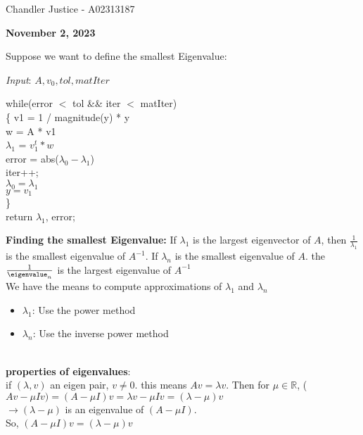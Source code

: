 \documentclass[12pt, AMS Euler]{article}
\newcommand{\R}{\mathbb{R}}
\begin{document}
\begin{flushright}
Chandler Justice - A02313187
\end{flushright}

\textbf{November 2, 2023}


Suppose we want to define the smallest Eigenvalue:

\textit{Input}: $A, v_0, tol, matIter$\\

\begin{listings}
	while(error $<$ tol \&\& iter $<$ matIter)\\
	\{
		v1 = 1 / magnitude(y) * y\\
		w = A * v1\\
		$\lambda_1$ = $v_1^t * w$\\

		error = abs($\lambda_0 - \lambda_1$)\\
		iter++;\\
		$\lambda_0 = \lambda_1$\\

		$y = v_1$\\

	\}\\
	return $\lambda_1$, error;
\end{listings}

\textbf{Finding the smallest Eigenvalue:} If $\lambda_1$ is the largest eigenvector of $A$, then $\frac{1}{\lambda_1}$ is the smallest eigenvalue of $A^{-1}$. If $\lambda_n$ is the smallest eigenvalue of $A$. the $\frac{1}{\eigenvalue_n}$ is the largest eigenvalue of $A^{-1}$\\

We have the means to compute approximations of $\lambda_1$ and $\lambda_n$
\begin{itemize}
	\item $\lambda_1$: Use the power method
	\item $\lambda_n$: Use the inverse power method
\end{itemize}\\

\textbf{properties of eigenvalues}:\\

if $(\lambda, v)$ an eigen pair, $v \neq 0$. this means $A v = \lambda v$. Then for $\mu \in \R$, ($Av - \mu I v) = (A - \mu I)v = \lambda v - \mu I v = (\lambda - \mu) v$\\
$\rightarrow (\lambda - \mu)$ is an eigenvalue of $(A - \mu I)$.\\
So, $(A - \mu I) v = (\lambda - \mu) v$\\
\end{document}
